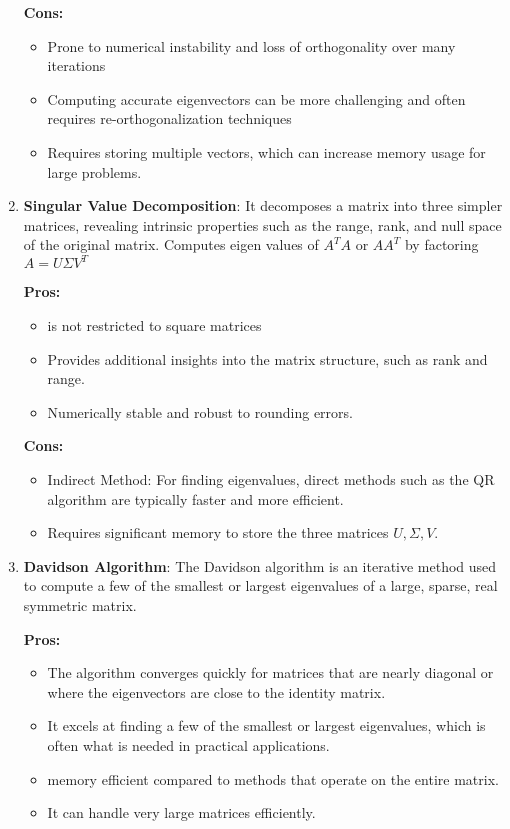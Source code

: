 \documentclass{article}
\theoremstyle{remark}
\begin{document}
\begin{enumerate}
    \textbf{Cons:}
    \begin{itemize}
        \item Prone to numerical instability and loss of orthogonality over many iterations

        \item Computing accurate eigenvectors can be more challenging and often requires re-orthogonalization techniques

        \item Requires storing multiple vectors, which can increase memory usage for large problems.
    \end{itemize}

    \item \textbf{Singular Value Decomposition}: It decomposes a matrix into three simpler matrices, revealing intrinsic properties such as the range, rank, and null space of the original matrix. Computes eigen values of $A^T A$ or $AA^T$ by factoring $A=U\Sigma V^T$

    \textbf{Pros:}
    \begin{itemize}
        \item is not restricted to square matrices
        \item Provides additional insights into the matrix structure, such as rank and range.
        \item Numerically stable and robust to rounding errors.
    \end{itemize}

    \textbf{Cons:}
    \begin{itemize}
        \item Indirect Method: For finding eigenvalues, direct methods such as the QR algorithm are typically faster and more efficient.
        \item Requires significant memory to store the three matrices $U, \Sigma, V$.
    
    \end{itemize}

    \item \textbf{Davidson Algorithm}: The Davidson algorithm is an iterative method used to compute a few of the smallest or largest eigenvalues of a large, sparse, real symmetric matrix.

    \textbf{Pros:}
    \begin{itemize}
        \item The algorithm converges quickly for matrices that are nearly diagonal or where the eigenvectors are close to the identity matrix.
        \item It excels at finding a few of the smallest or largest eigenvalues, which is often what is needed in practical applications.
        \item memory efficient compared to methods that operate on the entire matrix.
        \item It can handle very large matrices efficiently.
    \end{itemize}


\end{enumerate}
\end{document}
